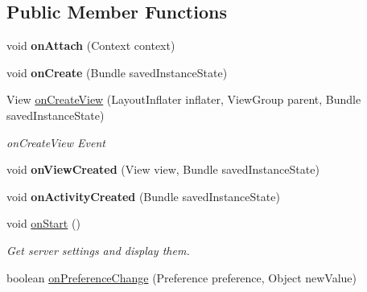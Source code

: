 \subsection*{Public Member Functions}
\begin{DoxyCompactItemize}
\item 
void {\bfseries on\+Attach} (Context context)\hypertarget{classedu_1_1tamu_1_1rfsignalmap_1_1_settings_fragment_aadf43016ef135a1e5169e998d5b8ff83}{}\label{classedu_1_1tamu_1_1rfsignalmap_1_1_settings_fragment_aadf43016ef135a1e5169e998d5b8ff83}

\item 
void {\bfseries on\+Create} (Bundle saved\+Instance\+State)\hypertarget{classedu_1_1tamu_1_1rfsignalmap_1_1_settings_fragment_aff3f72f2aa6dbb4cd10e6d614aae8287}{}\label{classedu_1_1tamu_1_1rfsignalmap_1_1_settings_fragment_aff3f72f2aa6dbb4cd10e6d614aae8287}

\item 
View \hyperlink{classedu_1_1tamu_1_1rfsignalmap_1_1_settings_fragment_a1dc3057a7372763d9499a2a38b5dc339}{on\+Create\+View} (Layout\+Inflater inflater, View\+Group parent, Bundle saved\+Instance\+State)
\begin{DoxyCompactList}\small\item\em on\+Create\+View Event \end{DoxyCompactList}\item 
void {\bfseries on\+View\+Created} (View view, Bundle saved\+Instance\+State)\hypertarget{classedu_1_1tamu_1_1rfsignalmap_1_1_settings_fragment_aa9cdfb48cdf85edaca43117131934646}{}\label{classedu_1_1tamu_1_1rfsignalmap_1_1_settings_fragment_aa9cdfb48cdf85edaca43117131934646}

\item 
void {\bfseries on\+Activity\+Created} (Bundle saved\+Instance\+State)\hypertarget{classedu_1_1tamu_1_1rfsignalmap_1_1_settings_fragment_afd602256dd19948e343575c5a0924c09}{}\label{classedu_1_1tamu_1_1rfsignalmap_1_1_settings_fragment_afd602256dd19948e343575c5a0924c09}

\item 
void \hyperlink{classedu_1_1tamu_1_1rfsignalmap_1_1_settings_fragment_abd35754f99cbb57ae98a596d96265133}{on\+Start} ()\hypertarget{classedu_1_1tamu_1_1rfsignalmap_1_1_settings_fragment_abd35754f99cbb57ae98a596d96265133}{}\label{classedu_1_1tamu_1_1rfsignalmap_1_1_settings_fragment_abd35754f99cbb57ae98a596d96265133}

\begin{DoxyCompactList}\small\item\em Get server settings and display them. \end{DoxyCompactList}\item 
boolean \hyperlink{classedu_1_1tamu_1_1rfsignalmap_1_1_settings_fragment_ac8251b6f76caa8443e6585c3e2fd8ed4}{on\+Preference\+Change} (Preference preference, Object new\+Value)\hypertarget{classedu_1_1tamu_1_1rfsignalmap_1_1_settings_fragment_ac8251b6f76caa8443e6585c3e2fd8ed4}{}\label{classedu_1_1tamu_1_1rfsignalmap_1_1_settings_fragment_ac8251b6f76caa8443e6585c3e2fd8ed4}


\end{DoxyCompactItemize}
